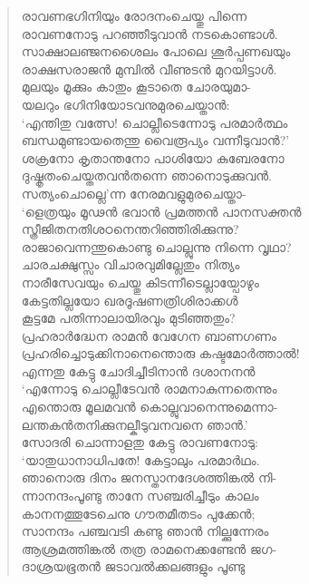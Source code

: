 \begin{verse}
രാവണഭഗിനിയും രോദനംചെയ്തു പിന്നെ\\
രാവണനോടു പറഞ്ഞീടുവാന്‍ നടകൊണ്ടാള്‍.\\
സാക്ഷാലഞ്ജനശൈലം പോലെ ശൂര്‍പ്പണഖയും\\
രാക്ഷസരാജന്‍ മുമ്പില്‍ വീണുടന്‍ മുറയിട്ടാള്‍.\\
മുലയും മൂക്കും കാതും കൂടാതെ ചോരയുമാ-\\
യലറും ഭഗിനിയോടവനുമുരചെയ്താന്‍:\\
‘എന്തിതു വത്സേ! ചൊല്ലീടെന്നോടു പരമാര്‍ത്ഥം\\
ബന്ധമുണ്ടായതെന്തു വൈരൂപ്യം വന്നീടുവാന്‍?’\\
ശക്രനോ കൃതാന്തനോ പാശിയോ കുബേരനോ\\
ദുഷ്കൃതംചെയ്തതവന്‍തന്നെ ഞാനൊടുക്കുവന്‍.\\
സത്യംചൊല്ലെ’ന്ന നേരമവളുമുരചെയ്താ-\\
‘ളെത്രയും മൂഢന്‍ ഭവാന്‍ പ്രമത്തന്‍ പാനസക്തന്‍\\
സ്ത്രീജിതനതിശഠനെന്തറിഞ്ഞിരിക്കുന്നു?\\
രാജാവെന്നന്തുകൊണ്ടു ചൊല്ലുന്നു നിന്നെ വൃഥാ?\\
ചാരചക്ഷുസ്സം വിചാരവുമില്ലേതും നിത്യം\\
നാരീസേവയും ചെയ്തു കിടന്നീടെല്ലായ്പോഴും\\
കേട്ടതില്ലയോ ഖരദൂഷണത്രിശിരാക്കള്‍\\
കൂട്ടമേ പതിന്നാലായിരവും മുടിഞ്ഞതും?\\
പ്രഹരാര്‍ദ്ധേന രാമന്‍ വേഗേന ബാണഗണം\\
പ്രഹരിച്ചൊടുക്കിനാനെന്തൊരു കഷ്ടമോര്‍ത്താല്‍!\\
എന്നതു കേട്ടു ചോദിച്ചീടിനാന്‍ ദശാനനന്‍\\
‘എന്നോടു ചൊല്ലീടേവന്‍ രാമനാകുന്നതെന്നും\\
എന്തൊരു മൂലമവന്‍ കൊല്ലുവാനെന്നുമെന്നാ-\\
ലന്തകന്‍തനിക്കുനല്കീടുവനവനെ ഞാന്‍.’\\
സോദരി ചൊന്നാളതു കേട്ടു രാവണനോടു:\\
‘യാതുധാനാധിപതേ! കേട്ടാലും പരമാര്‍ഥം.\\
ഞാനൊരു ദിനം ജനസ്താനദേശത്തിങ്കല്‍ നി-\\
ന്നാനന്ദംപൂണ്ടു താനേ സഞ്ചരിച്ചീടും കാലം\\
കാനനത്തൂടേചെനു ഗൗതമീതടം പുക്കേന്‍;\\
സാനന്ദം പഞ്ചവടി കണ്ടു ഞാന്‍ നില്ക്കുന്നേരം\\
ആശ്രമത്തിങ്കല്‍ തത്ര രാമനെക്കണ്ടേന്‍ ജഗ-\\
ദാശ്രയഭൂതന്‍ ജടാവല്‍ക്കലങ്ങളും പൂണ്ടു\\

\end{verse}
